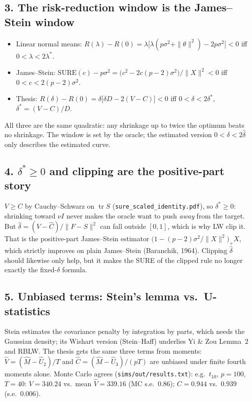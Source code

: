 \documentclass[12pt]{article}
\begin{document}
\subsection*{3. The risk-reduction window is the James--Stein window}
\begin{itemize}
\item Linear normal means: $R(\lambda)-R(0)=\lambda\big[\lambda(p\sigma^2+\|\theta\|^2)-2p\sigma^2\big]<0$ iff
$0<\lambda<2\lambda^*$.
\item James--Stein: $\mathrm{SURE}(c)-p\sigma^2=\big(c^2-2c(p-2)\sigma^2\big)/\|X\|^2<0$ iff $0<c<2(p-2)\sigma^2$.
\item Thesis: $R(\delta)-R(0)=\delta\big[\delta D-2(V-C)\big]<0$ iff $0<\delta<2\delta^*$, $\delta^*=(V-C)/D$.
\end{itemize}
All three are the same quadratic: any shrinkage up to twice the optimum beats no shrinkage. The window is
set by the oracle; the estimated version $0<\delta<2\hat\delta$ only describes the estimated curve.

\subsection*{4. $\delta^*\ge0$ and clipping are the positive-part story}
$V\ge C$ by Cauchy--Schwarz on $\operatorname{tr}S$ (\texttt{sure\_scaled\_identity.pdf}), so $\delta^*\ge0$:
shrinking toward $\nu I$ never makes the oracle want to push \emph{away} from the target. But
$\hat\delta=(\hat V-\hat C)/\|F-S\|^2$ can fall outside $[0,1]$, which is why LW clip it. That is the
positive-part James--Stein estimator $\big(1-(p-2)\sigma^2/\|X\|^2\big)_+X$, which strictly improves on
plain James--Stein (Baranchik, 1964). Clipping $\hat\delta$ should likewise only help, but it makes the
SURE of the clipped rule no longer exactly the fixed-$\delta$ formula.

\subsection*{5. Unbiased terms: Stein's lemma vs.\ U-statistics}
Stein estimates the covariance penalty by integration by parts, which needs the Gaussian density; its
Wishart version (Stein--Haff) underlies Yi \& Zou Lemma~2 and RBLW. The thesis gets the same three terms
from moments: $\hat V=(\hat M-\hat U_2)/T$ and $\hat C=(\hat M-\hat U_3)/(pT)$ are unbiased under finite
fourth moments alone. Monte Carlo agrees (\texttt{sims/out/results.txt}): e.g.\ $t_{10}$, $p=100$, $T=40$:
$V=340.24$ vs.\ mean $\hat V=339.16$ (MC s.e.\ $0.86$); $C=0.944$ vs.\ $0.939$ (s.e.\ $0.006$).
\end{document}
